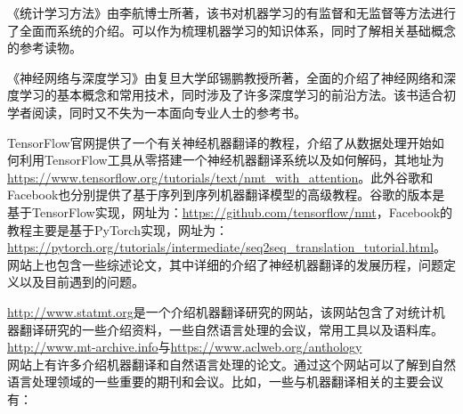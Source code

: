 \parinterval 《统计学习方法》\cite{李航2012统计学习方法}由李航博士所著，该书对机器学习的有监督和无监督等方法进行了全面而系统的介绍。可以作为梳理机器学习的知识体系，同时了解相关基础概念的参考读物。

\parinterval 《神经网络与深度学习》\cite{邱锡鹏2020神经网络与深度学习}由复旦大学邱锡鹏教授所著，全面的介绍了神经网络和深度学习的基本概念和常用技术，同时涉及了许多深度学习的前沿方法。该书适合初学者阅读，同时又不失为一本面向专业人士的参考书。

\parinterval  TensorFlow官网提供了一个有关神经机器翻译的教程，介绍了从数据处理开始如何利用TensorFlow工具从零搭建一个神经机器翻译系统以及如何解码，其地址为\url{https://www.tensorflow.org/tutorials/text/nmt\_with\_attention}。此外谷歌和Facebook也分别提供了基于序列到序列机器翻译模型的高级教程。谷歌的版本是基于TensorFlow实现，网址为：\url{https://github.com/tensorflow/nmt}，Facebook的教程主要是基于PyTorch实现，网址为：\url{https://pytorch.org/tutorials/intermediate/seq2seq\_translation\_tutorial.html}。网站上也包含一些综述论文，其中详细的介绍了神经机器翻译的发展历程，问题定义以及目前遇到的问题。

\parinterval  \url{http://www.statmt.org}是一个介绍机器翻译研究的网站，该网站包含了对统计机器翻译研究的一些介绍资料，一些自然语言处理的会议，常用工具以及语料库。\url{http://www.mt-archive.info}与\url{https://www.aclweb.org/anthology}\\网站上有许多介绍机器翻译和自然语言处理的论文。通过这个网站可以了解到自然语言处理领域的一些重要的期刊和会议。比如，一些与机器翻译相关的主要会议有：

